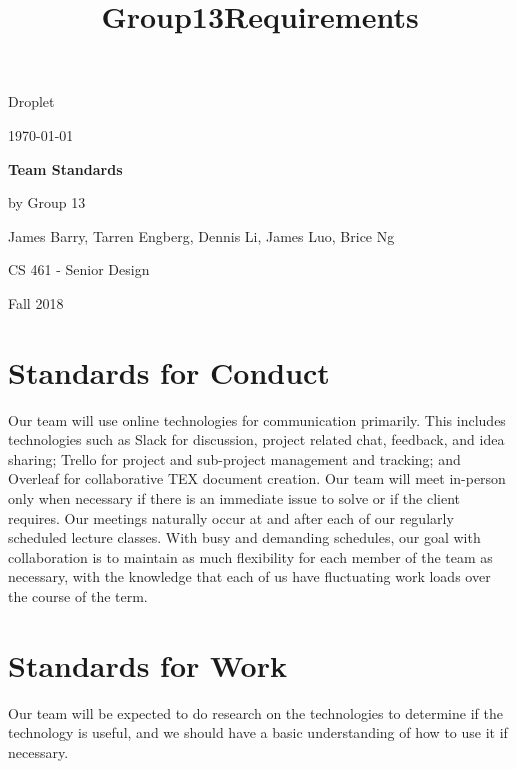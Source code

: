 \documentclass[draftclsnofoot, onecolumn,journal,letterpaper,10pt]{IEEEtran}
\title{Group13Requirements}
\def \TitlePageHeader{Droplet}
\def \TitlePageTitle{Team Standards}
\def \GroupNumber{by Group 13}
\def \GroupMembers{James Barry, Tarren Engberg, Dennis Li, James Luo,  Brice Ng}
\def \CourseTitle{CS 461 - Senior Design}
\def \CourseTerm{Fall 2018}
\newcommand{\NameSigPair}[1]{\par
\makebox[2.75in][r]{#1} \hfil 	\makebox[3.25in]{\makebox[2.25in]{\hrulefill} \hfill		\makebox[.75in]{\hrulefill}}
\par\vspace{-12pt} \textit{\tiny\noindent
\makebox[2.75in]{} \hfil		\makebox[3.25in]{\makebox[2.25in][r]{Signature} \hfill	\makebox[.75in][r]{Date}}}}
\renewcommand{\NameSigPair}[1]{#1}
\begin{document}
\begin{titlepage}
    \begin{singlespace}
        \hfill    
        \par\vspace{.2in}
        \centering
        \scshape{
            \huge \TitlePageHeader \par
            {\large\today}\par
            \vspace{.5in}
            \textbf{\Huge \TitlePageTitle }\par
            \vfill
            \vspace{5pt}

            \vspace{5pt}
            {\Large
                \NameSigPair{\GroupNumber}\par
            	\NameSigPair{\GroupMembers}\par
                \NameSigPair{\CourseTitle}\par
                \NameSigPair{\CourseTerm}\par
            }
            \vspace{20pt}
        }
    \end{singlespace}
\end{titlepage}

\newpage
{}
\clearpage

\pagebreak

\section{Standards for Conduct}

Our team will use online technologies for communication primarily. This includes technologies such as Slack for discussion, project related chat, feedback, and idea sharing; Trello for project and sub-project management and tracking; and Overleaf for collaborative TEX document creation. Our team will meet in-person only when necessary if there is an immediate issue to solve or if the client requires. Our meetings naturally occur at and after each of our regularly scheduled lecture classes. With busy and demanding schedules, our goal with collaboration is to maintain as much flexibility for each member of the team as necessary, with the knowledge that each of us have fluctuating work loads over the course of the term.

\section{Standards for Work }
Our team will be expected to do research on the technologies to determine if the technology is useful, and we should have a basic understanding of how to use it if necessary. 
\end{document}
